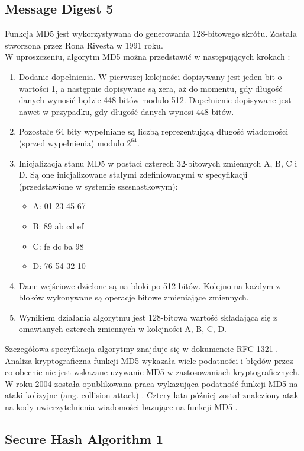 \subsection{Message Digest 5}
Funkcja MD5 jest wykorzystywana do generowania 128-bitowego skrótu. Została stworzona przez Rona Rivesta w 1991 roku. \\
W uproszczeniu, algorytm MD5 można przedstawić w następujących krokach \cite{crypto101}:
\begin{enumerate}
	\itemsep0em
	\item Dodanie dopełnienia. W pierwszej kolejności dopisywany jest jeden bit o wartości 1, a następnie dopisywane są zera, aż do momentu, gdy długość danych wynosić będzie 448 bitów modulo 512. Dopełnienie dopisywane jest nawet w przypadku, gdy długość danych wynosi 448 bitów.
	\item Pozostałe 64 bity wypełniane są liczbą reprezentującą długość wiadomości (sprzed wypełnienia) modulo $2^{64}$. 
	\item Inicjalizacja stanu MD5 w postaci czterech 32-bitowych zmiennych A, B, C i D. Są one inicjalizowane stałymi zdefiniowanymi w specyfikacji (przedstawione w systemie szesnastkowym): 
		\begin{itemize}
			\item A: 01 23 45 67
			\item B: 89 ab cd ef
			\item C: fe dc ba 98
			\item D: 76 54 32 10
		\end{itemize}
	\item Dane wejściowe dzielone są na bloki po 512 bitów. Kolejno na każdym z bloków wykonywane są operacje bitowe zmieniające zmiennych. 
	\item Wynikiem działania algorytmu jest 128-bitowa wartość składająca się z omawianych czterech zmiennych w kolejności A, B, C, D.
\end{enumerate} 
Szczegółowa specyfikacja algorytmy znajduje się w dokumencie RFC 1321 \cite{md5rfc}. \\
Analiza kryptograficzna funkcji MD5 wykazała wiele podatności i błędów przez co obecnie nie jest wskazane używanie MD5 w zastosowaniach kryptograficznych. 
W roku 2004 została opublikowana praca wykazująca podatność funkcji MD5 na ataki kolizyjne (ang. collision attack) \cite{md5cert}. Cztery lata później został znaleziony atak na kody uwierzytelnienia wiadomości bazujące na funkcji MD5 \cite{md5hmac}.

\subsection{Secure Hash Algorithm 1}


